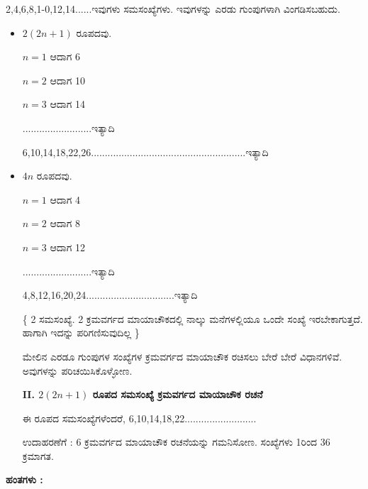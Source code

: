 2,4,6,8,1-0,12,14......ಇವುಗಳು ಸಮಸಂಖ್ಯೆಗಳು. ಇವುಗಳನ್ನು ಎರಡು ಗುಂಪುಗಳಾಗಿ ವಿಂಗಡಿಸಬಹುದು.

\begin{itemize}
	\item $2 (2n+1)$ ರೂಪದವು.

	$n=1$ ಆದಾಗ 6

	$n=2$ ಆದಾಗ 10

	$n=3$ ಆದಾಗ 14

	.........................ಇತ್ಯಾದಿ

	6,10,14,18,22,26........................................................ಇತ್ಯಾದಿ
	\item $4n$ ರೂಪದವು. 

	$n=1$ ಆದಾಗ 4

	$n=2$ ಆದಾಗ 8

	$n=3$ ಆದಾಗ 12

	.........................ಇತ್ಯಾದಿ

	4,8,12,16,20,24................................ಇತ್ಯಾದಿ

	\{ 2 ಸಮಸಂಖ್ಯೆ. 2 ಕ್ರಮವರ್ಗದ ಮಾಯಾಚೌಕದಲ್ಲಿ ನಾಲ್ಕು ಮನೆಗಳಲ್ಲಿಯೂ ಒಂದೇ ಸಂಖ್ಯೆ ಇರಬೇಕಾಗುತ್ತದೆ. ಹಾಗಾಗಿ ಇದನ್ನು ಪರಿಗಣಿಸುವುದಿಲ್ಲ \}

	ಮೇಲಿನ ಎರಡೂ ಗುಂಪುಗಳ ಸಂಖ್ಯೆಗಳ ಕ್ರಮವರ್ಗದ ಮಾಯಾಚೌಕ ರಚಿಸಲು ಬೇರೆ ಬೇರೆ ವಿಧಾನಗಳಿವೆ. ಅವುಗಳನ್ನು ಪರಿಚಯಿಸಿಕೊಳ್ಳೋಣ.

	\textbf{II. $2 (2n+1)$ ರೂಪದ ಸಮಸಂಖ್ಯೆ  ಕ್ರಮವರ್ಗದ ಮಾಯಾಚೌಕ ರಚನೆ}

	ಈ ರೂಪದ ಸಮಸಂಖ್ಯೆಗಳೆಂದರೆ, 6,10,14,18,22..........................

	ಉದಾಹರಣೆಗೆ : 6 ಕ್ರಮವರ್ಗದ ಮಾಯಾಚೌಕ ರಚನೆಯನ್ನು ಗಮನಿಸೋಣ. ಸಂಖ್ಯೆಗಳು 1ರಿಂದ 36 ಕ್ರಮಾಗತ.
\end{itemize}

\textbf{ಹಂತಗಳು :}


